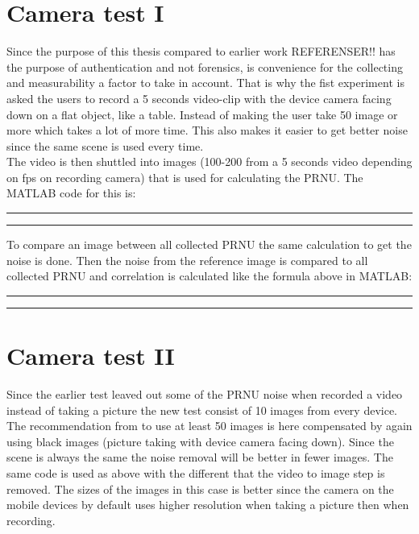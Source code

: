 \section{Camera test I}
Since the purpose of this thesis compared to earlier work REFERENSER!! has the purpose of authentication and not forensics, is convenience for the collecting and measurability a factor to take in account. That is why the fist experiment is asked the users to record a 5 seconds video-clip with the device camera facing down on a flat object, like a table. Instead of making the user take 50 image or more which takes a lot of more time. This also makes it easier to get better noise since the same scene is used every time. \\
The video is then shuttled into images (100-200 from a 5 seconds video depending on fps on recording camera) that is used for calculating the PRNU. The MATLAB code for this is:\\
\rule{\textwidth}{0.5pt}
  
\rule{\textwidth}{0.5pt}

To compare an image between all collected PRNU the same calculation to get the noise is done. Then the noise from the reference image is compared to all collected PRNU and correlation is calculated like the formula above in MATLAB:\\
\rule{\textwidth}{0.5pt}
  
\rule{\textwidth}{0.5pt}

\section{Camera test II}
Since the earlier test leaved out some of the PRNU noise when recorded a video instead of taking a picture the new test consist of 10 images from every device. The recommendation from \cite{sensor:camera:DCIdent} to use at least 50 images is here compensated by again using black images (picture taking with device camera facing down). Since the scene is always the same the noise removal will be better in fewer images. The same code is used as above with the different that the video to image step is removed. The sizes of the images in this case is better since the camera on the mobile devices by default uses higher resolution when taking a picture then when recording. 